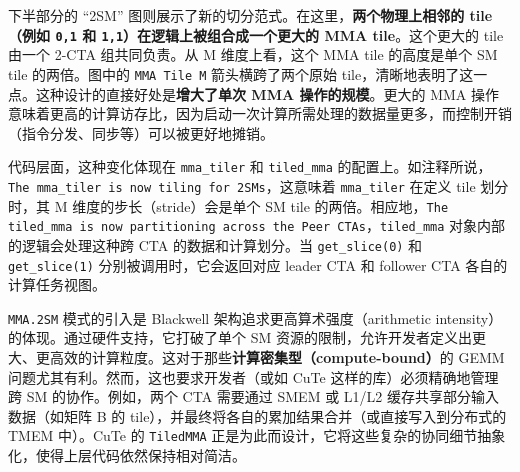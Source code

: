 下半部分的 “2\allowbreak{}SM” 图则展示了新的切分范式。在这里，\textbf{两个物理上相邻的 tile（例如 \texttt{0,\allowbreak{}1} 和 \texttt{1,\allowbreak{}1}）在逻辑上被组合成一个更大的 MMA tile}。这个更大的 tile 由一个 2-CTA 组共同负责。从 M 维度上看，这个 MMA tile 的高度是单个 SM tile 的两倍。图中的 \texttt{MMA Tile M} 箭头横跨了两个原始 tile，清晰地表明了这一点。这种设计的直接好处是\textbf{增大了单次 MMA 操作的规模}。更大的 MMA 操作意味着更高的计算访存比，因为启动一次计算所需处理的数据量更多，而控制开销（指令分发、同步等）可以被更好地摊销。

代码层面，这种变化体现在 \texttt{mma\_\allowbreak{}tiler} 和 \texttt{tiled\_\allowbreak{}mma} 的配置上。如注释所说，\texttt{T\allowbreak{}h\allowbreak{}e\allowbreak{} \allowbreak{}m\allowbreak{}m\allowbreak{}a\allowbreak{}\_\allowbreak{}t\allowbreak{}i\allowbreak{}l\allowbreak{}e\allowbreak{}r\allowbreak{} \allowbreak{}i\allowbreak{}s\allowbreak{} \allowbreak{}n\allowbreak{}o\allowbreak{}w\allowbreak{} \allowbreak{}t\allowbreak{}i\allowbreak{}l\allowbreak{}i\allowbreak{}n\allowbreak{}g\allowbreak{} \allowbreak{}f\allowbreak{}o\allowbreak{}r\allowbreak{} \allowbreak{}2\allowbreak{}S\allowbreak{}M\allowbreak{}s}，这意味着 \texttt{mma\_\allowbreak{}tiler} 在定义 tile 划分时，其 M 维度的步长（stride）会是单个 SM tile 的两倍。相应地，\texttt{T\allowbreak{}h\allowbreak{}e\allowbreak{} \allowbreak{}t\allowbreak{}i\allowbreak{}l\allowbreak{}e\allowbreak{}d\allowbreak{}\_\allowbreak{}m\allowbreak{}m\allowbreak{}a\allowbreak{} \allowbreak{}i\allowbreak{}s\allowbreak{} \allowbreak{}n\allowbreak{}o\allowbreak{}w\allowbreak{} \allowbreak{}p\allowbreak{}a\allowbreak{}r\allowbreak{}t\allowbreak{}i\allowbreak{}t\allowbreak{}i\allowbreak{}o\allowbreak{}n\allowbreak{}i\allowbreak{}n\allowbreak{}g\allowbreak{} \allowbreak{}a\allowbreak{}c\allowbreak{}r\allowbreak{}o\allowbreak{}s\allowbreak{}s\allowbreak{} \allowbreak{}t\allowbreak{}h\allowbreak{}e\allowbreak{} \allowbreak{}P\allowbreak{}e\allowbreak{}e\allowbreak{}r\allowbreak{} \allowbreak{}C\allowbreak{}T\allowbreak{}A\allowbreak{}s}，\texttt{tiled\_\allowbreak{}mma} 对象内部的逻辑会处理这种跨 CTA 的数据和计算划分。当 \texttt{get\_\allowbreak{}slice(0)} 和 \texttt{get\_\allowbreak{}slice(1)} 分别被调用时，它会返回对应 leader CTA 和 follower CTA 各自的计算任务视图。

\texttt{MMA.\allowbreak{}2\allowbreak{}SM} 模式的引入是 Blackwell 架构追求更高算术强度（arithmetic intensity）的体现。通过硬件支持，它打破了单个 SM 资源的限制，允许开发者定义出更大、更高效的计算粒度。这对于那些\textbf{计算密集型（compute-bound）}的 GEMM 问题尤其有利。然而，这也要求开发者（或如 Cu\allowbreak{}Te 这样的库）必须精确地管理跨 SM 的协作。例如，两个 CTA 需要通过 SMEM 或 L1/\allowbreak{}L2 缓存共享部分输入数据（如矩阵 B 的 tile），并最终将各自的累加结果合并（或直接写入到分布式的 TMEM 中）。Cu\allowbreak{}Te 的 \texttt{Tiled\allowbreak{}MMA} 正是为此而设计，它将这些复杂的协同细节抽象化，使得上层代码依然保持相对简洁。

